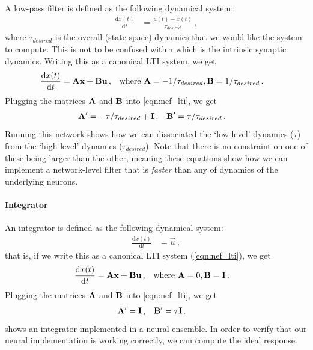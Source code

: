 \documentclass[10pt,letterpaper,oneside]{article}
\begin{document}
A low-pass filter is defined as the following dynamical system:
\begin{align*}
	\frac{\mathrm{d} x(t)}{\mathrm{d}t} &= \frac {u(t)-x(t)}{\tau_{desired}} \,,
\end{align*}
where $\tau_{desired}$ is the overall (state space) dynamics that we would like the system to compute. This is not to be confused with $\tau$ which is the intrinsic synaptic dynamics. Writing this as a canonical LTI system, we get
\begin{align*}
	\frac{\mathrm{d} x(t)}{\mathrm{d}t} &= {\mathbf{A}} {\mathbf{x}} + {\mathbf{B}} {\mathbf{u}} \,, && \text{where } {\mathbf{A}} = -1/\tau_{desired}, {\mathbf{B}} = 1/\tau_{desired} \,.
\end{align*}
Plugging the matrices ${\mathbf{A}}$ and ${\mathbf{B}}$ into \cref{eqn:nef_lti}, we get
\begin{align*}
	{\mathbf{A}}' &= -\tau/\tau_{desired} + {\mathbf{I}} \,, & {\mathbf{B}}' &= \tau/\tau_{desired} \,.
\end{align*}
Running this network shows how we can dissociated the `low-level' dynamics ($\tau$) from the `high-level' dynamics ($\tau_{desired}$). Note that there is no constraint on one of these being larger than the other, meaning these equations show how we can implement a network-level filter  that is \emph{faster} than any of dynamics of the underlying neurons.

\paragraph{Integrator}

An integrator is defined as the following dynamical system:
\begin{align*}
	\frac{\mathrm{d} x(t)}{\mathrm{d}t} &= \vec u \,,
\end{align*}
that is, if we write this as a canonical LTI system (\cref{eqn:nef_lti}), we get
\begin{align*}
	\frac{\mathrm{d} x(t)}{\mathrm{d}t} &= {\mathbf{A}} {\mathbf{x}} + {\mathbf{B}} {\mathbf{u}} \,, && \text{where } {\mathbf{A}} = 0, {\mathbf{B}} = {\mathbf{I}} \,.
\end{align*}
Plugging the matrices ${\mathbf{A}}$ and ${\mathbf{B}}$ into \cref{eqn:nef_lti}, we get
\begin{align*}
	{\mathbf{A}}' &= {\mathbf{I}} \,, & {\mathbf{B}}' &= \tau {\mathbf{I}} \,.
\end{align*}
 shows an integrator implemented in a neural ensemble. In order to verify that our neural implementation is working correctly, we can compute the ideal response.
\end{document}

